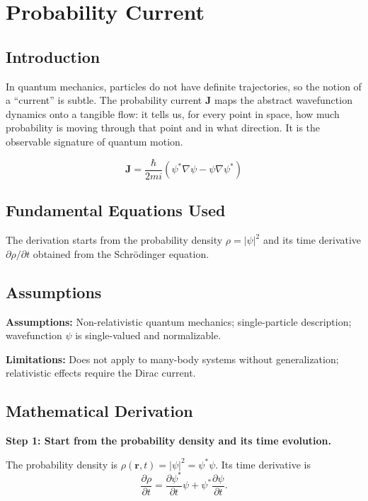\chapter{Probability Current}

\section*{Introduction}

In quantum mechanics, particles do not have definite trajectories, so the notion of a ``current'' is subtle. The probability current $\mathbf{J}$ maps the abstract wavefunction dynamics onto a tangible flow: it tells us, for every point in space, how much probability is moving through that point and in what direction. It is the observable signature of quantum motion.


\begin{equation}
\mathbf{J} = \frac{\hbar}{2mi}\left(\psi^*\nabla\psi - \psi\nabla\psi^*\right)
\end{equation}

\section*{Fundamental Equations Used}

The derivation starts from the probability density $\rho = |\psi|^2$ and its time derivative $\partial\rho/\partial t$ obtained from the Schr\"odinger equation.

\section*{Assumptions}

\textbf{Assumptions:} Non-relativistic quantum mechanics; single-particle description; wavefunction $\psi$ is single-valued and normalizable.


\textbf{Limitations:} Does not apply to many-body systems without generalization; relativistic effects require the Dirac current.


\section*{Mathematical Derivation}

\textbf{Step 1: Start from the probability density and its time evolution.}

The probability density is $\rho(\mathbf{r},t) = |\psi|^2 = \psi^*\psi$. Its time derivative is
\begin{equation}
\frac{\partial\rho}{\partial t} = \frac{\partial\psi^*}{\partial t}\psi + \psi^*\frac{\partial\psi}{\partial t}.
\end{equation}

